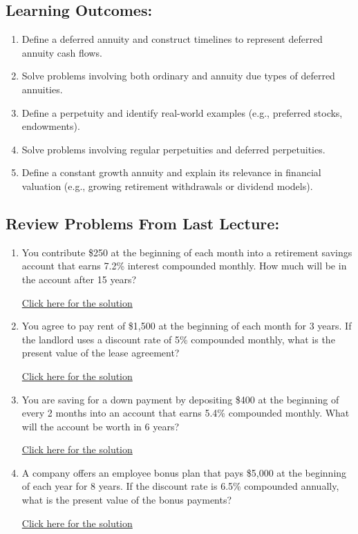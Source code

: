 \documentclass[
]{book}
\providecommand{\tightlist}{%
  \setlength{\itemsep}{0pt}\setlength{\parskip}{0pt}}
\begin{document}
\subsection*{Learning Outcomes:}\label{learning-outcomes-17}

\begin{enumerate}
\def\labelenumi{\arabic{enumi}.}
\tightlist
\item
  Define a deferred annuity and construct timelines to represent deferred annuity cash flows.
\item
  Solve problems involving both ordinary and annuity due types of deferred annuities.
\item
  Define a perpetuity and identify real-world examples (e.g., preferred stocks, endowments).
\item
  Solve problems involving regular perpetuities and deferred perpetuities.
\item
  Define a constant growth annuity and explain its relevance in financial valuation (e.g., growing retirement withdrawals or dividend models).
\end{enumerate}

\subsection*{Review Problems From Last Lecture:}\label{review-problems-from-last-lecture-16}

\begin{enumerate}
\def\labelenumi{\arabic{enumi}.}
\tightlist
\item
  You contribute \$250 at the beginning of each month into a retirement savings account that earns 7.2\% interest compounded monthly. How much will be in the account after 15 years?

  \href{https://youtu.be/e7x69WQbUy8}{Click here for the solution}
\item
  You agree to pay rent of \$1,500 at the beginning of each month for 3 years. If the landlord uses a discount rate of 5\% compounded monthly, what is the present value of the lease agreement?

  \href{https://youtu.be/VqldJMs4-Oo}{Click here for the solution}
\item
  You are saving for a down payment by depositing \$400 at the beginning of every 2 months into an account that earns 5.4\% compounded monthly. What will the account be worth in 6 years?

  \href{https://youtu.be/DHjYuRYo8JI}{Click here for the solution}
\item
  A company offers an employee bonus plan that pays \$5,000 at the beginning of each year for 8 years. If the discount rate is 6.5\% compounded annually, what is the present value of the bonus payments?

  \href{https://youtu.be/pipYbAzRvG4}{Click here for the solution}
\end{enumerate}
\end{document}
